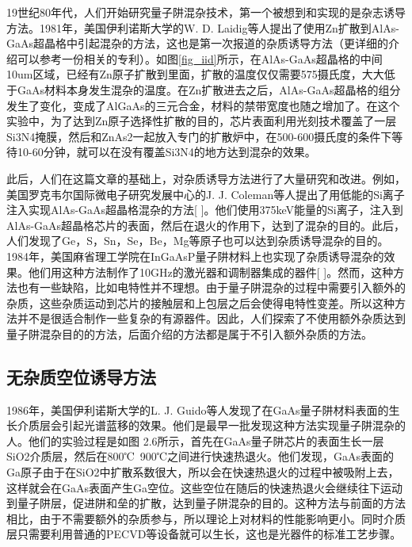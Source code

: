 \documentclass[oneside]{ZJUthesis}
\begin{document}
19世纪80年代，人们开始研究量子阱混杂技术，第一个被想到和实现的是杂志诱导方法。1981年，美国伊利诺斯大学的W. D. Laidig等人提出了使用Zn扩散到AlAs-GaAs超晶格中引起混杂的方法\cite{laidig1981disorder}，这也是第一次报道的杂质诱导方法（更详细的介绍可以参考一份相关的专利\cite{holonyak1983method}）。如图\ref{fig_iid}所示，在AlAs-GaAs超晶格的中间10um区域，已经有Zn原子扩散到里面，扩散的温度仅仅需要575摄氏度，大大低于GaAs材料本身发生混杂的温度。在Zn扩散进去之后，AlAs-GaAs超晶格的组分发生了变化，变成了AlGaAs的三元合金，材料的禁带宽度也随之增加了。在这个实验中，为了达到Zn原子选择性扩散的目的，芯片表面利用光刻技术覆盖了一层Si3N4掩膜，然后和ZnAs2一起放入专门的扩散炉中，在500-600摄氏度的条件下等待10-60分钟，就可以在没有覆盖Si3N4的地方达到混杂的效果。

此后，人们在这篇文章的基础上，对杂质诱导方法进行了大量研究和改进。例如，美国罗克韦尔国际微电子研究发展中心的J. J. Coleman等人提出了用低能的Si离子注入实现AlAs-GaAs超晶格混杂的方法[ ]。他们使用375keV能量的Si离子，注入到AlAs-GaAs超晶格芯片的表面，然后在退火的作用下，达到了混杂的目的。此后，人们发现了Ge，S，Sn，Se，Be，Mg等原子也可以达到杂质诱导混杂的目的。1984年，美国麻省理工学院在InGaAsP量子阱材料上也实现了杂质诱导混杂的效果。他们用这种方法制作了10GHz的激光器和调制器集成的器件[ ]。然而，这种方法也有一些缺陷，比如电特性并不理想。由于量子阱混杂的过程中需要引入额外的杂质，这些杂质运动到芯片的接触层和上包层之后会使得电特性变差。所以这种方法并不是很适合制作一些复杂的有源器件。因此，人们探索了不使用额外杂质达到量子阱混杂目的的方法，后面介绍的方法都是属于不引入额外杂质的方法。

\subsection{无杂质空位诱导方法}

1986年，美国伊利诺斯大学的L. J. Guido等人发现了在GaAs量子阱材料表面的生长介质层会引起光谱蓝移的效果。他们是最早一批发现这种方法实现量子阱混杂的人。他们的实验过程是如图 2.6所示，首先在GaAs量子阱芯片的表面生长一层SiO2介质层，然后在800℃~900℃之间进行快速热退火。他们发现，GaAs表面的Ga原子由于在SiO2中扩散系数很大，所以会在快速热退火的过程中被吸附上去，这样就会在GaAs表面产生Ga空位。这些空位在随后的快速热退火会继续往下运动到量子阱层，促进阱和垒的扩散，达到量子阱混杂的目的。这种方法与前面的方法相比，由于不需要额外的杂质参与，所以理论上对材料的性能影响更小。同时介质层只需要利用普通的PECVD等设备就可以生长，这也是光器件的标准工艺步骤。
\end{document}
